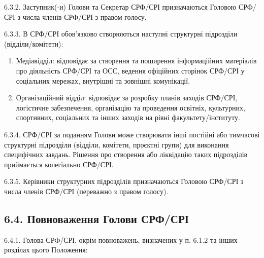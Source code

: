     6.3.2. Заступник(-и) Голови та Секретар СРФ/СРІ призначаються Головою СРФ/СРІ з числа членів СРФ/СРІ з правом голосу.

    6.3.3. В СРФ/СРІ обов'язково створюються наступні структурні підрозділи (відділи/комітети):

        \begin{enumerate}[label=\alph*)]
            \item Медіавідділ: відповідає за створення та поширення інформаційних матеріалів про діяльність СРФ/СРІ та ОСС, ведення офіційних сторінок СРФ/СРІ у соціальних мережах, внутрішні та зовнішні комунікації.
            \item Організаційний відділ: відповідає за розробку планів заходів СРФ/СРІ, логістичне забезпечення, організацію та проведення освітніх, культурних, спортивних, соціальних та інших заходів на рівні факультету/інституту.
        \end{enumerate}

    6.3.4. СРФ/СРІ за поданням Голови може створювати інші постійні або тимчасові структурні підрозділи (відділи, комітети, проєктні групи) для виконання специфічних завдань. Рішення про створення або ліквідацію таких підрозділів приймається колегіально СРФ/СРІ.

    6.3.5. Керівники структурних підрозділів призначаються Головою СРФ/СРІ з числа членів СРФ/СРІ (переважно з правом голосу).

\subsection*{6.4. Повноваження Голови СРФ/СРІ}
    6.4.1. Голова СРФ/СРІ, окрім повноважень, визначених у п. 6.1.2 та інших розділах цього Положення:

